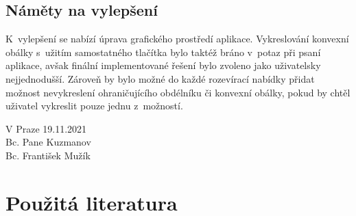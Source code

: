 \documentclass[a4paper, 12pt, oneside, titlepage]{article} %
\begin{document}
\subsection{Náměty na vylepšení} \label{vylepseni}
K~vylepšení se nabízí úprava grafického prostředí aplikace. Vykreslování konvexní obálky s~užitím samostatného tlačítka bylo taktéž bráno v~potaz při psaní aplikace, avšak finální implementované řešení bylo zvoleno jako uživatelsky nejjednodušší. Zároveň by bylo možné do každé rozevírací nabídky přidat možnost nevykreslení ohraničujícího obdélníku či konvexní obálky, pokud by chtěl uživatel vykreslit pouze jednu z~možností. 


\begin{flushright}
V Praze 19.11.2021\\
\vspace{2mm}
Bc. Pane Kuzmanov\\
Bc. František Mužík\\
\end{flushright}


\clearpage 
\section*{Použitá literatura}
\renewcommand{\section}[2]{}%


\end{document}
